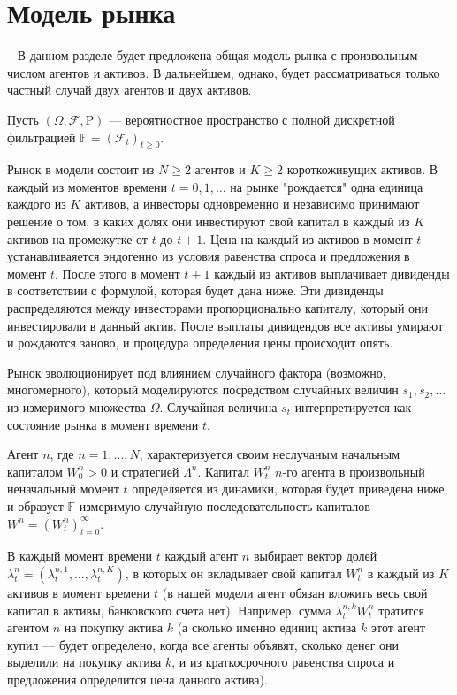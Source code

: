 \documentclass[a4paper,12pt,russian]{article} %
\theoremstyle{definition}
\renewcommand{\P}{\mathrm{P}}
\newcommand{\F}{\mathcal{F}}
\begin{document}
\section{Модель рынка}\
\label{section2-model}
В данном разделе будет предложена общая модель рынка с 
произвольным числом агентов и активов. В дальнейшем, однако, будет рассматриваться только частный случай двух агентов и двух активов.

Пусть $(\Omega,\F,\P)$ — вероятностное пространство с полной дискретной фильтрацией $\mathbb{F} = (\F_t)_{t\ge 0}$.

Рынок в модели состоит из $N\ge 2$ агентов и $K\ge 2$ короткоживущих активов. В каждый из моментов времени $t=0,1,\dots$ на рынке "рождается" одна единица каждого из $K$ активов, а инвесторы одновременно и независимо принимают решение о том, в каких долях они инвестируют свой капитал в каждый из $K$ активов на промежутке от $t$ до $t+1$. Цена на каждый из активов в момент $t$ устанавливаяется эндогенно из условия равенства спроса и предложения в момент $t$. После этого в момент $t+1$ каждый из активов выплачивает дивиденды в соответствии с формулой, которая будет дана ниже. Эти дивиденды распределяются между инвесторами пропорционально капиталу, который они инвестировали в данный актив. После выплаты дивидендов все активы умирают и рождаются заново, и процедура определения цены происходит опять. 

Рынок эволюционирует под влиянием случайного фактора (возможно, многомерного), который моделируются посредством случайных величин $s_1, s_2, \dots$ из измеримого множества $\Omega$. Случайная величина $s_t$ интерпретируется как состояние рынка в момент времени $t$.

Агент $n$, где $n=1,\ldots,N$, характеризуется своим неслучаным начальным капиталом $W^n_0 >0$ и стратегией $\Lambda^n$. Капитал $W_t^n$ $n$-го агента в произвольный неначальный момент $t$ определяется из динамики, которая будет приведена ниже, и образует $\mathbb{F}$-измеримую случайную последовательность капиталов $W^n = (W_t^n)_{t=0}^\infty$.

В каждый момент времени $t$ каждый агент $n$ выбирает вектор долей $\lambda_t^n = (\lambda_{t}^{n,1},\ldots,\lambda_{t}^{n,K})$, в которых он вкладывает свой капитал $W_t^n$ в каждый из $K$ активов в момент времени $t$ (в нашей модели агент обязан вложить весь свой капитал в активы, банковского счета нет). Например, сумма $\lambda_{t}^{n,k} W_t^n$ тратится агентом $n$ на покупку актива $k$ (а сколько именно единиц актива $k$ этот агент купил — будет определено, когда все агенты объявят, сколько денег они выделили на покупку актива $k$, и из краткосрочного равенства спроса и предложения определится цена данного актива).
\end{document}
